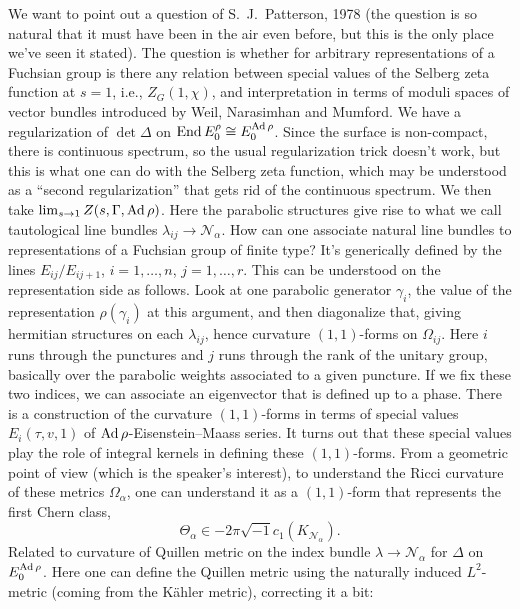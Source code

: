 \documentclass[reqno]{amsart} 
\numberwithin{theorem}{section}
\numberwithin{equation}{section}
\begin{document}
We want to point out a question of S.\ J.\ Patterson, 1978 (the question is so natural that it must have been in the air even before, but this is the only place we've seen it stated).  The question is whether for arbitrary representations of a Fuchsian group is there any relation between special values of the Selberg zeta function at $s = 1$, i.e., $Z_G(1, \chi)$, and interpretation in terms of moduli spaces of vector bundles introduced by Weil, Narasimhan and Mumford.  We have a regularization of $\det \Delta$ on $\operatorname{End} E_0^\rho \cong E_0^{\operatorname{Ad} \rho}$.  Since the surface is non-compact, there is continuous spectrum, so the usual regularization trick doesn't work, but this is what one can do with the Selberg zeta function, which may be understood as a ``second regularization'' that gets rid of the continuous spectrum.  We then take $\lim_{s \rightarrow 1} Z(s, \Gamma, \operatorname{Ad} \rho)$.  Here the parabolic structures give rise to what we call tautological line bundles $\lambda_{i j} \rightarrow \mathcal{N}_\alpha$.  How can one associate natural line bundles to representations of a Fuchsian group of finite type?  It's generically defined by the lines $E_{i j} / E_{i j + 1}$, $i = 1, \dotsc, n$, $j = 1, \dotsc, r$.  This can be understood on the representation side as follows.  Look at one parabolic generator $\gamma_i$, the value of the representation $\rho(\gamma_i)$ at this argument, and then diagonalize that, giving hermitian structures on each $\lambda_{i j}$, hence curvature $(1, 1)$-forms on $\Omega_{i j}$.  Here $i$ runs through the punctures and $j$ runs through the rank of the unitary group, basically over the parabolic weights associated to a given puncture.  If we fix these two indices, we can associate an eigenvector that is defined up to a phase.  There is a construction of the curvature $(1,1)$-forms in terms of special values $E_i(\tau, v, 1)$ of $\operatorname{Ad} \rho$-Eisenstein--Maass series.  It turns out that these special values play the role of integral kernels in defining these $(1,1)$-forms.  From a geometric point of view (which is the speaker's interest), to understand the Ricci curvature of these metrics $\Omega_\alpha$, one can understand it as a $(1,1)$-form that represents the first Chern class,
\begin{equation*}
  \Theta_\alpha \in - 2 \pi \sqrt{- 1} c_1(K_{\mathcal{N}_\alpha}).
\end{equation*}
Related to curvature of Quillen metric on the index bundle $\lambda \rightarrow \mathcal{N}_\alpha$ for $\Delta$ on $E_0^{\operatorname{Ad} \rho}$.  Here one can define the Quillen metric using the naturally induced $L^2$-metric (coming from the K\"{a}hler metric), correcting it a bit:
\end{document}
